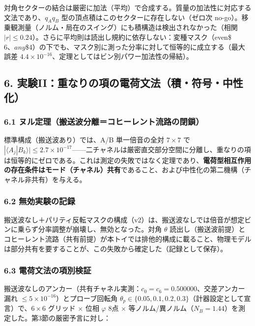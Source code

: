\documentclass[
  a4paper,
]{ltjsarticle}
\begin{document}
対角セクターの結合は厳密に加法（平均）で合成する。質量の加法性に対応する文法であり、\(q_Aq_B\)
型の頂点積はこのセクターに存在しない（ゼロ次
no-go）。移乗観測量（ノルム・局在のスイング）にも積構造は検出されなかった（相関
\(|r|\le0.24\)）。さらに平均則は読出し規約に依存しない：変種マスク（even\$\ge\(6、any\)\ge\$4）の下でも、マスク別に測った分率に対して恒等的に成立する（最大誤差
\(4.4\times10^{-16}\)、定理としてはビン別パワー加法性の帰結）。

\subsection{6.
実験II：重なりの項の電荷文法（積・符号・中性化）}\label{ux5b9fux9a13iiux91cdux306aux308aux306eux9805ux306eux96fbux8377ux6587ux6cd5ux7a4dux7b26ux53f7ux4e2dux6027ux5316}

\subsubsection{6.1
ヌル定理（搬送波分離＝コヒーレント流路の閉鎖）}\label{ux30ccux30ebux5b9aux7406ux642cux9001ux6ce2ux5206ux96e2ux30b3ux30d2ux30fcux30ecux30f3ux30c8ux6d41ux8defux306eux9589ux9396}

標準構成（搬送波あり）では、A/B 単一倍音の全対 \(7\times7\) で
\(|\langle A_j|B_k\rangle|\le2.7\times10^{-17}\)------二チャネルは厳密直交部分空間に分離し、重なりの項は恒等的にゼロである。これは測定の失敗ではなく定理であり、\textbf{電荷型相互作用の存在条件はモード（チャネル）共有}であること、および中性化の第二機構（チャネル非共有）を与える。

\subsubsection{6.2
無効実験の記録}\label{ux7121ux52b9ux5b9fux9a13ux306eux8a18ux9332}

搬送波なし＋パリティ反転マスクの構成（v2）は、搬送波なしでは倍音が想定ビンに乗らず分率調整が崩壊し、無効となった。対角
\(\theta\)
読出し（搬送波前提）とコヒーレント流路（共有前提）が本トイでは排他的構成に載ること、物理モデルは部分共有を要することが、この失敗から確定した（記録として保存）。

\subsubsection{6.3
電荷文法の項別検証}\label{ux96fbux8377ux6587ux6cd5ux306eux9805ux5225ux691cux8a3c}

搬送波なしのアンカー（共有チャネル実測：\(c_0=c_6=0.500000\)、交差アンカー漏れ
\(\le5\times10^{-16}\)）とプローブ回転角
\(\theta_p\in\{0.05,0.1,0.2,0.3\}\)（計器設定として宣言）で、\(6\times6\)
グリッド × 位相 \(\varphi\) 8点 ×
等ノルム/異ノルム（\(N_B=1.44\)）を測定した。第3節の厳密予言に対し：
\end{document}
